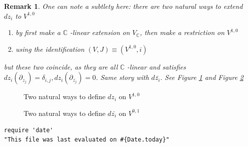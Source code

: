 \documentclass[11pt]{article}
\newtheorem{remark}{Remark}
\begin{document}
\begin{remark}
One can note a subtlety here: there are two natural ways to extend \(dz_i\) to \(V^{1,0}\)
\begin{enumerate}
\item by first make a \(\mathbb{C}\) -linear extension on \(V_{\mathbb{C}}\), then make a restriction on \(V^{1,0}\)
\item using the identification \((V,J)\equiv (V^{1,0},i)\)
\end{enumerate}
but these two coincide, as they are all \(\mathbb{C}\) -linear and satisfies \(dz_i(\partial_{z_j}) =
\delta_{i,j}, dz_i(\partial_{\bar{z_j}}) = 0\). Same story with \(d\bar{z_i}\). See Figure \ref{fig:dz}
and Figure \ref{fig:dzbar}
\end{remark}

\begin{figure}
\centering
\label{fig:dz}
\caption{Two natural ways to define $dz_i$ on $V^{1,0}$}
\end{figure}

\begin{figure}
\centering
\label{fig:dzbar}
\caption{Two natural ways to define $d\bar{z_i}$ on $V^{0,1}$}
\end{figure}


\begin{verbatim}
require 'date'
"This file was last evaluated on #{Date.today}"
\end{verbatim}
\end{document}
